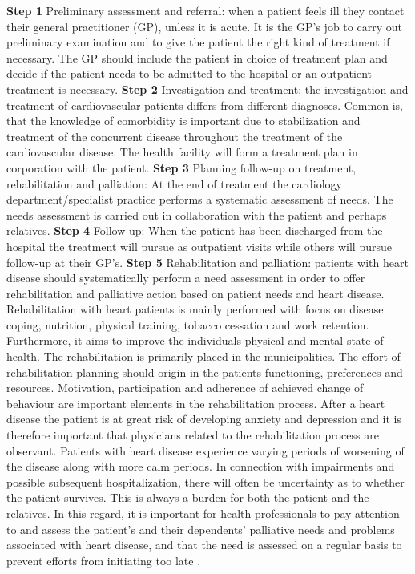 \textbf{Step 1} Preliminary assessment and referral: when a patient feels ill they contact their general practitioner (GP), unless it is acute. It is the GP's job to carry out preliminary examination and to give the patient the right kind of treatment if necessary. The GP should include the patient in choice of treatment plan and decide if the patient needs to be admitted to the hospital or an outpatient treatment is necessary. 
\newline
\newline
\textbf{Step 2} Investigation and treatment: the investigation and treatment of cardiovascular patients differs from different diagnoses. Common is, that the knowledge of comorbidity is important due to stabilization and treatment of the concurrent disease throughout the treatment of the cardiovascular disease. The health facility will form a treatment plan in corporation with the patient. 
\newline
\newline
\textbf{Step 3} Planning follow-up on treatment, rehabilitation and palliation: At the end of treatment the cardiology department/specialist practice performs a systematic assessment of needs. The needs assessment is carried out in collaboration with the patient and perhaps relatives. 
\newline
\newline
\textbf{Step 4} Follow-up: When the patient has been discharged from the hospital the treatment will pursue as outpatient visits while others will pursue follow-up at their GP's. 
\newline
\newline
\textbf{Step 5} Rehabilitation and palliation: patients with heart disease should systematically perform a need assessment in order to offer rehabilitation and palliative action based on patient needs and heart disease. Rehabilitation with heart patients is mainly performed with focus on disease coping, nutrition, physical training, tobacco cessation and work retention. Furthermore, it aims to improve the individuals physical and mental state of health. The rehabilitation is primarily placed in the municipalities. The effort of rehabilitation planning should origin in the patients functioning, preferences and resources. Motivation, participation and adherence of achieved change of behaviour are important elements in the rehabilitation process. After a heart disease the patient is at great risk of developing anxiety and depression and it is therefore important that physicians related to the rehabilitation process are observant. 
\newline
\newline
Patients with heart disease experience varying periods of worsening of the disease along with more calm periods. In connection with impairments and possible subsequent hospitalization, there will often be uncertainty as to whether the patient survives. This is always a burden for both the patient and the relatives. In this regard, it is important for health professionals to pay attention to and assess the patient's and their dependents' palliative needs and problems associated with heart disease, and that the need is assessed on a regular basis to prevent efforts from initiating too late \cite{behandlingsforlob}.


